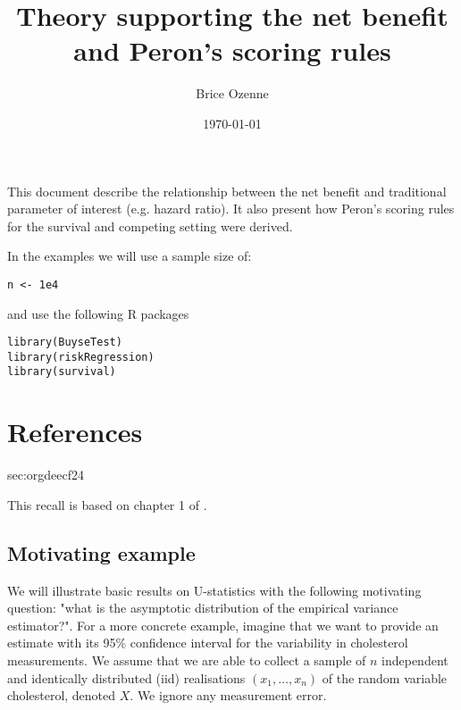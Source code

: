 \documentclass[12pt]{article}
\author{Brice Ozenne}
\date{\today}
\title{Theory supporting the net benefit and Peron's scoring rules}
\begin{document}
\maketitle
This document describe the relationship between the net benefit and
traditional parameter of interest (e.g. hazard ratio). It also present
how Peron's scoring rules for the survival and competing setting were
derived.

\bigskip

In the examples we will use a sample size of:
\lstset{language=r,label= ,caption= ,captionpos=b,numbers=none}
\begin{lstlisting}
n <- 1e4
\end{lstlisting}

and use the following R packages
\lstset{language=r,label= ,caption= ,captionpos=b,numbers=none}
\begin{lstlisting}
library(BuyseTest)
library(riskRegression)
library(survival)
\end{lstlisting}

\tableofcontents

\clearpage

\section{References}
\label{sec:org547c61f}
\begingroup
\renewcommand{\section}[2]{}



\endgroup

\clearpage

\appendix

\section{Recall on the U-statistic theory}
\label{sec:orgdeecf24}

This recall is based on chapter 1 of \cite{lee1990u}.

\subsection{Motivating example}
\label{sec:org73d8d3b}

We will illustrate basic results on U-statistics with the following
motivating question: "what is the asymptotic distribution of the
empirical variance estimator?". For a more concrete example, imagine
that we want to provide an estimate with its 95\% confidence interval
for the variability in cholesterol measurements. We assume that we are
able to collect a sample of \(n\) independent and identically
distributed (iid) realisations \((x_1,\ldots,x_n)\) of the random
variable cholesterol, denoted \(X\). We ignore any measurement error.
\end{document}
